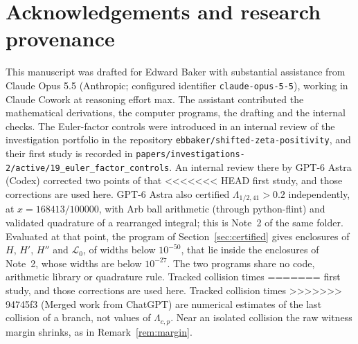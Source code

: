 \documentclass[11pt]{article}
\numberwithin{equation}{section}
\theoremstyle{definition}
\theoremstyle{remark}
\newcommand{\Lag}{\mathscr L_0}
\begin{document}
\section*{Acknowledgements and research provenance}\label{sec:provenance}
This manuscript was drafted for Edward Baker with substantial assistance
from Claude Opus 5.5 (Anthropic; configured identifier
\texttt{claude-opus-5-5}), working in Claude Cowork at reasoning effort
max. The assistant contributed the mathematical derivations, the computer
programs, the drafting and the internal checks. The Euler-factor controls
were introduced in an internal review of the investigation portfolio in the
repository \texttt{ebbaker/shifted-zeta-positivity}, and their first study is
recorded in \texttt{papers/investigations-2/active/19\_euler\_factor\_controls}.
An internal review there by GPT-6 Astra (Codex) corrected two points of that
<<<<<<< HEAD
first study, and those corrections are used here. GPT-6 Astra also certified
$\Lambda_{1/2,41}>0.2$ independently, at $x=168413/100000$, with Arb ball
arithmetic (through python-flint) and validated quadrature of a rearranged
integral; this is Note~2 of the same folder. Evaluated at that point, the
program of Section~\ref{sec:certified} gives enclosures of $H$, $H'$, $H''$
and $\Lag$, of widths below $10^{-50}$, that lie inside the enclosures of
Note~2, whose widths are below $10^{-27}$. The two programs share no code,
arithmetic library or quadrature rule. Tracked collision times
=======
first study, and those corrections are used here. Tracked collision times
>>>>>>> 94745f3 (Merged work from ChatGPT)
are numerical estimates of the last collision of a branch, not values of
$\Lambda_{c,p}$. Near an isolated collision the raw witness margin shrinks,
as in Remark~\ref{rem:margin}.
\end{document}
